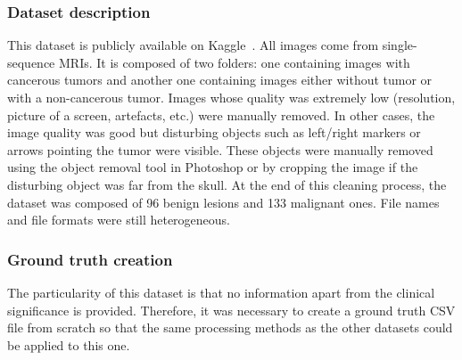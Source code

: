 \subsubsection{Dataset description}
\setlength{\marginparwidth}{3cm}\leavevmode {}This dataset is publicly available on Kaggle~\cite{51}. All images come from single-sequence MRIs. It is composed of two folders: one containing images with cancerous tumors and another one containing images either without tumor or with a non-cancerous tumor. Images whose quality was extremely low (resolution, picture of a screen, artefacts, etc.) were manually removed. In other cases, the image quality was good but disturbing objects such as left/right markers or arrows pointing the tumor were visible. These objects were manually removed using the object removal tool in Photoshop or by cropping the image if the disturbing object was far from the skull. At the end of this cleaning process, the dataset was composed of 96 benign lesions and 133 malignant ones. File names and file formats were still heterogeneous.


\subsubsection{Ground truth creation}
\label{sec:braingroundtruth}
\setlength{\marginparwidth}{3cm}\leavevmode {}The particularity of this dataset is that no information apart from the clinical significance is provided. Therefore, it was necessary to create a ground truth CSV file from scratch so that the same processing methods as the other datasets could be applied to this one.

